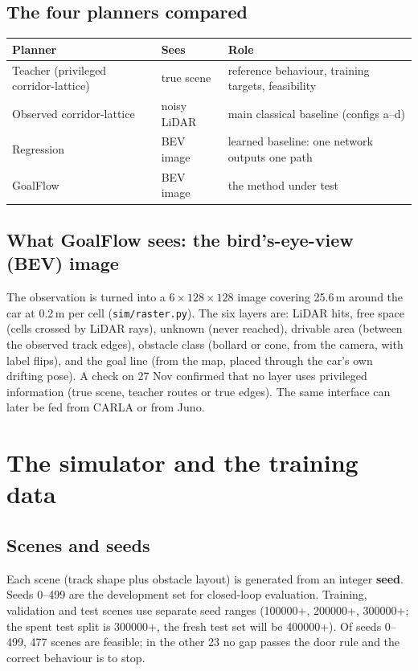\documentclass[11pt,a4paper]{article}
\newcommand{\code}[1]{\texttt{#1}}
\newcommand{\term}[1]{\textbf{#1}}
\begin{document}
\subsection{The four planners compared}
\begin{table}[h]
\small
\begin{tabularx}{\linewidth}{@{}lLL@{}}
\toprule
Planner & Sees & Role \\
\midrule
Teacher (privileged corridor-lattice) & true scene & reference behaviour, training targets, feasibility \\
Observed corridor-lattice & noisy LiDAR & main classical baseline (configs a--d) \\
Regression & BEV image & learned baseline: one network outputs one path \\
GoalFlow & BEV image & the method under test \\
\bottomrule
\end{tabularx}
\end{table}

\subsection{What GoalFlow sees: the bird's-eye-view (BEV) image}
The observation is turned into a $6\times128\times128$ image covering 25.6\,m around the car at 0.2\,m per
cell (\code{sim/raster.py}). The six layers are: LiDAR hits, free space (cells crossed by LiDAR rays),
unknown (never reached), drivable area (between the observed track edges), obstacle class (bollard or
cone, from the camera, with label flips), and the goal line (from the map, placed through the car's own drifting
pose). A check on 27 Nov confirmed that no layer uses privileged information (true scene, teacher routes or true
edges). The same interface can later be fed from CARLA or from Juno.

\section{The simulator and the training data}

\subsection{Scenes and seeds}
Each scene (track shape plus obstacle layout) is generated from an integer \term{seed}. Seeds 0--499 are
the development set for closed-loop evaluation. Training, validation and test scenes use separate seed
ranges (100000+, 200000+, 300000+; the spent test split is 300000+, the fresh test set will be
400000+). Of seeds 0--499, 477 scenes are feasible; in the other 23 no gap passes
the door rule and the correct behaviour is to stop.
\end{document}
